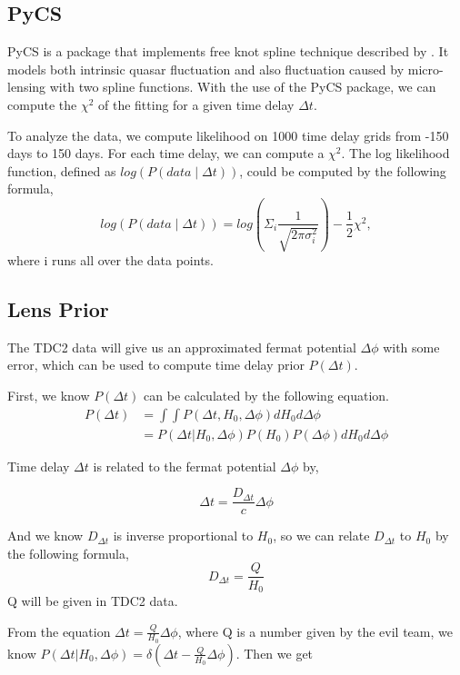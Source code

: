 \documentclass[\docopts]{\docclass}
\begin{document}
\subsection{PyCS}
PyCS is a package that implements free knot spline technique described by \cite{2013A&A...553A.120T}. It models both intrinsic quasar fluctuation and also fluctuation caused by micro-lensing with two spline functions. With the use of the PyCS package, we can compute the $\chi^2$ of the fitting for a given time delay $\Delta t$.

To analyze the data, we compute likelihood on 1000 time delay grids from -150 days to 150 days.  For each time delay, we can compute a $\chi^2$. The log likelihood function, defined as $log(P(data \mid \Delta t))$, could be computed by the following formula,
\begin{equation}
log(P(data \mid \Delta t))  = log (\Sigma_i  \frac{1}{\sqrt{2 \pi \sigma_i^2}} ) -\frac{1}{2} \chi^2,
\end{equation}
where i runs all over the data points.

\subsection{Lens Prior}
The TDC2 data will give us an approximated fermat potential $\Delta \phi$ with some error, which can be used to compute time delay prior $P(\Delta t)$.

First, we know $P(\Delta t)$ can be calculated by the following equation.
\begin{align}
P(\Delta t) &= \int \int P(\Delta t, H_0, \Delta \phi) dH_0 d \Delta \phi \\
&= P(\Delta t | H_0, \Delta \phi) P(H_0)P(\Delta \phi) dH_0 d\Delta \phi
\end{align}

Time delay $\Delta t$ is related to the fermat potential $\Delta \phi$ by,

\begin{equation}
\Delta t = \frac{D_{\Delta t}}{c} \Delta \phi
\end{equation}

And we know $D_{\Delta t}$ is inverse proportional to $H_0$, so we can relate $D_{\Delta t}$ to $H_0$ by the following formula,
\begin{equation}
D_{\Delta t}= \frac{Q}{H_0}
\end{equation}
Q will be given in TDC2 data.

From the equation $\Delta t = \frac{Q}{H_0}\Delta \phi$, where Q is a number given by the evil team, we know
$P(\Delta t | H_0, \Delta \phi) = \delta(\Delta t - \frac{Q}{H_0}\Delta \phi)$.
Then we get
\end{document}
